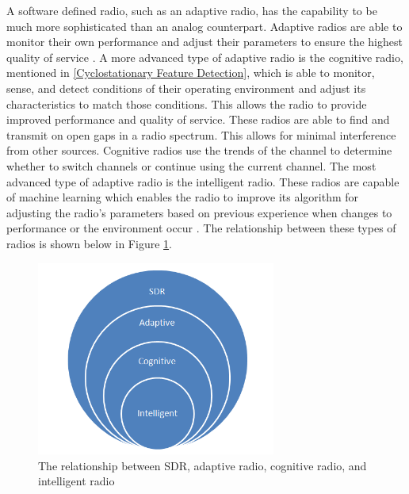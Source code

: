 A software defined radio, such as an adaptive radio, has the capability to be much more sophisticated than an analog counterpart. Adaptive radios are able to monitor their own performance and adjust their parameters to ensure the highest quality of service \cite{cog_radios}. A more advanced type of adaptive radio is the cognitive radio, mentioned in \ref{Cyclostationary Feature Detection}, which is able to monitor, sense, and detect conditions of their operating environment and adjust its characteristics to match those conditions. This allows the radio to provide improved performance and quality of service. These radios are able to find and transmit on open gaps in a radio spectrum. This allows for minimal interference from other sources. Cognitive radios use the trends of the channel to determine whether to switch channels or continue using the current channel. The most advanced type of adaptive radio is the intelligent radio. These radios are capable of machine learning which enables the radio to improve its algorithm for adjusting the radio's parameters based on previous experience when changes to performance or the environment occur \cite{int_radio}. The relationship between these types of radios is shown below in Figure \ref{fig:sdr_relationship_diagram}.\par
\begin{figure}[ht]
\centering
\includegraphics[width=0.70\textwidth]{img/sdr_diagram2.png}
\caption{The relationship between SDR, adaptive radio, cognitive radio, and intelligent radio}
\label{fig:sdr_relationship_diagram}
\end{figure}\par
